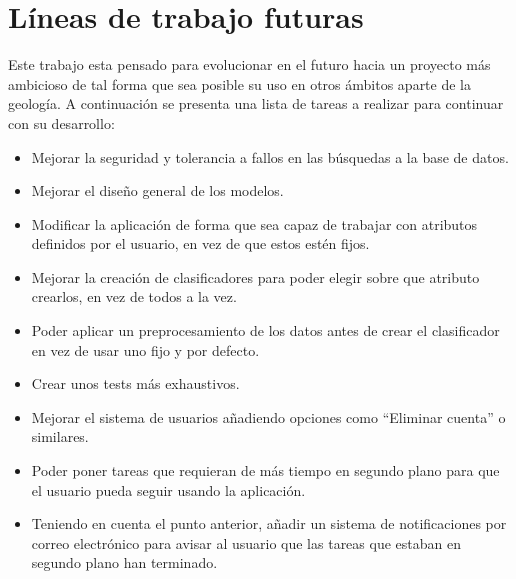 \section{Líneas de trabajo futuras}

Este trabajo esta pensado para evolucionar en el futuro hacia un proyecto más
ambicioso de tal forma que sea posible su uso en otros ámbitos aparte de la
geología. A continuación se presenta una lista de tareas a realizar para
continuar con su desarrollo:
\begin{itemize}
	\item Mejorar la seguridad y tolerancia a fallos en las búsquedas a la base de
	datos.
	\item Mejorar el diseño general de los modelos.
	\item Modificar la aplicación de forma que sea capaz de trabajar con atributos
	definidos por el usuario, en vez de que estos estén fijos.
	\item Mejorar la creación de clasificadores para poder elegir sobre que
	atributo crearlos, en vez de todos a la vez.
	\item Poder aplicar un preprocesamiento de los datos antes de crear el
	clasificador en vez de usar uno fijo y por defecto.
	\item Crear unos tests más exhaustivos.
	\item Mejorar el sistema de usuarios añadiendo opciones como ``Eliminar
	cuenta'' o similares.
	\item Poder poner tareas que requieran de más tiempo en segundo plano para que
	el usuario pueda seguir usando la aplicación.
	\item Teniendo en cuenta el punto anterior, añadir un sistema de
	notificaciones por correo electrónico para avisar al usuario que las tareas que
	estaban en segundo plano han terminado.
\end{itemize}

